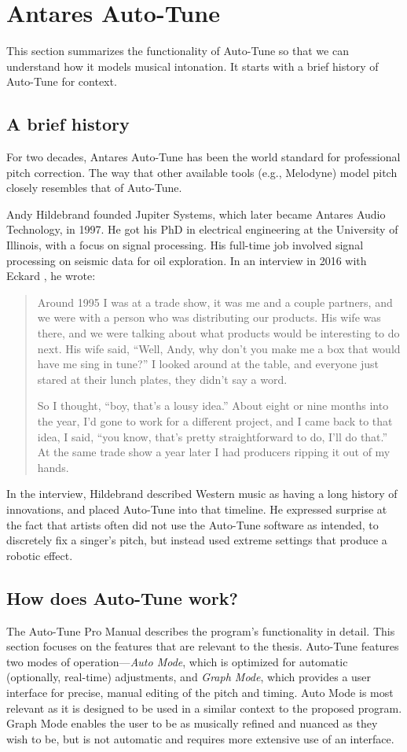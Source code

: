 \section{Antares Auto-Tune}
\label{sec:autotune}
This section summarizes the functionality of Auto-Tune so that we can understand how it models musical intonation. It starts with a brief history of Auto-Tune for context. 

\subsection{A brief history}
For two decades, Antares Auto-Tune has been the world standard for professional pitch correction. The way that other available tools (e.g.,  Melodyne) model pitch closely resembles that of Auto-Tune.

Andy Hildebrand founded Jupiter Systems, which later became Antares Audio Technology, in 1997. He got his PhD in electrical engineering at the University of Illinois, with a focus on signal processing. His full-time job involved signal processing on seismic data for oil exploration. In an interview in 2016 with Eckard \cite{eckard2016}, he wrote: 
\begin{quotation}Around 1995 I was at a trade show, it was me and a couple partners, and we were with a person who was distributing our products. His wife was there, and we were talking about what products would be interesting to do next. His wife said, ``Well, Andy, why don't you make me a box that would have me sing in tune?'' I looked around at the table, and everyone just stared at their lunch plates, they didn't say a word.

So I thought, ``boy, that's a lousy idea.'' About eight or nine months into the year, I'd gone to work for a different project, and I came back to that idea, I said, ``you know, that's pretty straightforward to do, I'll do that.'' At the same trade show a year later I had producers ripping it out of my hands.
\end{quotation}
In the interview, Hildebrand described Western music as having a long history of innovations, and placed Auto-Tune into that timeline. He expressed surprise at the fact that artists often did not use the Auto-Tune software as intended, to discretely fix a singer's pitch, but instead used extreme settings that produce a robotic effect.

\subsection{How does Auto-Tune work?}
The Auto-Tune Pro Manual \cite{antares:2018} describes the program's functionality in detail. This section focuses on the features that are relevant to the thesis. Auto-Tune features two modes of operation---\textit{Auto Mode}, which is optimized for automatic (optionally, real-time) adjustments, and \textit{Graph Mode}, which provides a user interface for precise, manual editing of the pitch and timing. Auto Mode is most relevant as it is designed to be used in a similar context to the proposed program. Graph Mode enables the user to be as musically refined and nuanced as they wish to be, but is not automatic and requires more extensive use of an interface.   

